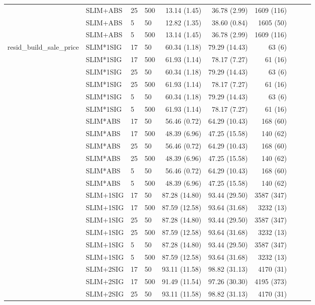\begin{longtable}{llllrrrrrr}
 & SLIM+ABS & 25 & 500 & 13.14 (1.45) & 36.78 (2.99) & 1609 (116) \\
 & SLIM+ABS & 5 & 50 & 12.82 (1.35) & 38.60 (0.84) & 1605 (50) \\
 & SLIM+ABS & 5 & 500 & 13.14 (1.45) & 36.78 (2.99) & 1609 (116) \\
\midrule
resid_build_sale_price & SLIM*1SIG & 17 & 50 & 60.34 (1.18) & 79.29 (14.43) & 63 (6) \\
 & SLIM*1SIG & 17 & 500 & 61.93 (1.14) & 78.17 (7.27) & 61 (16) \\
 & SLIM*1SIG & 25 & 50 & 60.34 (1.18) & 79.29 (14.43) & 63 (6) \\
 & SLIM*1SIG & 25 & 500 & 61.93 (1.14) & 78.17 (7.27) & 61 (16) \\
 & SLIM*1SIG & 5 & 50 & 60.34 (1.18) & 79.29 (14.43) & 63 (6) \\
 & SLIM*1SIG & 5 & 500 & 61.93 (1.14) & 78.17 (7.27) & 61 (16) \\
 & SLIM*ABS & 17 & 50 & 56.46 (0.72) & 64.29 (10.43) & 168 (60) \\
 & SLIM*ABS & 17 & 500 & 48.39 (6.96) & 47.25 (15.58) & 140 (62) \\
 & SLIM*ABS & 25 & 50 & 56.46 (0.72) & 64.29 (10.43) & 168 (60) \\
 & SLIM*ABS & 25 & 500 & 48.39 (6.96) & 47.25 (15.58) & 140 (62) \\
 & SLIM*ABS & 5 & 50 & 56.46 (0.72) & 64.29 (10.43) & 168 (60) \\
 & SLIM*ABS & 5 & 500 & 48.39 (6.96) & 47.25 (15.58) & 140 (62) \\
 & SLIM+1SIG & 17 & 50 & 87.28 (14.80) & 93.44 (29.50) & 3587 (347) \\
 & SLIM+1SIG & 17 & 500 & 87.59 (12.58) & 93.64 (31.68) & 3232 (13) \\
 & SLIM+1SIG & 25 & 50 & 87.28 (14.80) & 93.44 (29.50) & 3587 (347) \\
 & SLIM+1SIG & 25 & 500 & 87.59 (12.58) & 93.64 (31.68) & 3232 (13) \\
 & SLIM+1SIG & 5 & 50 & 87.28 (14.80) & 93.44 (29.50) & 3587 (347) \\
 & SLIM+1SIG & 5 & 500 & 87.59 (12.58) & 93.64 (31.68) & 3232 (13) \\
 & SLIM+2SIG & 17 & 50 & 93.11 (11.58) & 98.82 (31.13) & 4170 (31) \\
 & SLIM+2SIG & 17 & 500 & 91.49 (11.54) & 97.26 (30.30) & 4195 (373) \\
 & SLIM+2SIG & 25 & 50 & 93.11 (11.58) & 98.82 (31.13) & 4170 (31) \\

\end{longtable}

